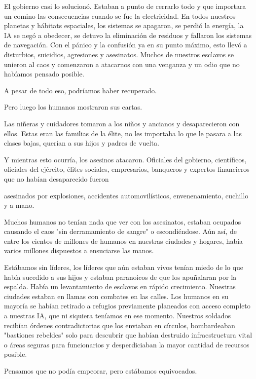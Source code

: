 \documentclass[spanish,12pt,a4paper,oneside,titlepage]{book}
\begin{document}
    El gobierno casi lo solucionó. Estaban a punto de cerrarlo todo y que importara un comino las consecuencias cuando se fue la electricidad. En todos nuestros planetas y hábitats espaciales, los sistemas se apagaron, se perdió la energía, la IA se negó a obedecer, se detuvo la eliminación de residuos y fallaron los sistemas de navegación. Con el pánico y la confusión ya en su punto máximo, esto llevó a disturbios, suicidios, agresiones y asesinatos. Muchos de nuestros esclavos se unieron al caos y comenzaron a atacarnos con una venganza y un odio que no habíamos pensado posible.

    A pesar de todo eso, podríamos haber recuperado.

    Pero luego los humanos mostraron sus cartas.

    Las niñeras y cuidadores tomaron a los niños y ancianos y desaparecieron con ellos. Estas eran las familias de la élite, no les importaba lo que le pasara a las clases bajas, querían a sus hijos y padres de vuelta.

    Y mientras esto ocurría, los asesinos atacaron. Oficiales del gobierno, científicos, oficiales del ejército, élites sociales, empresarios, banqueros y expertos financieros que no habían desaparecido fueron

    asesinados por explosiones, accidentes automovilísticos, envenenamiento, cuchillo y a mano.

    Muchos humanos no tenían nada que ver con los asesinatos, estaban ocupados causando el caos "sin derramamiento de sangre" o escondiéndose. Aún así, de entre los cientos de millones de humanos en nuestras ciudades y hogares, había varios millones dispuestos a ensuciarse las manos.

    Estábamos sin líderes, los líderes que aún estaban vivos tenían miedo de lo que había sucedido a sus hijos y estaban paranoicos de que los apuñalaran por la espalda. Había un levantamiento de esclavos en rápido crecimiento. Nuestras ciudades estaban en llamas con combates en las calles. Los humanos en su mayoría se habían retirado a refugios previamente planeados con acceso completo a nuestras IA, que ni siquiera teníamos en ese momento. Nuestros soldados recibían órdenes contradictorias que los enviaban en círculos, bombardeaban "bastiones rebeldes" solo para descubrir que habían destruido infraestructura vital o áreas seguras para funcionarios y desperdiciaban la mayor cantidad de recursos posible.

    Pensamos que no podía empeorar, pero estábamos equivocados.
\end{document}
